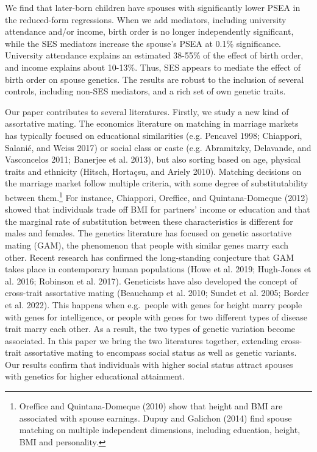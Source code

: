 \documentclass[
]{article}
\theoremstyle{definition}
\theoremstyle{definition}
\theoremstyle{definition}
\theoremstyle{definition}
\theoremstyle{remark}
\begin{document}
We find that later-born children have spouses with significantly lower PSEA in
the reduced-form regressions. When we add mediators, including university
attendance and/or income, birth order is no longer independently significant,
while the SES mediators increase the spouse's PSEA at 0.1\% significance.
University attendance explains an estimated 38-55\% of the effect of birth order,
and income explains about 10-13\%. Thus, SES appears to mediate the effect of
birth order on spouse genetics. The results are robust to the inclusion of
several controls, including non-SES mediators, and a rich set of own genetic
traits.

Our paper contributes to several literatures. Firstly, we study a new kind of
assortative mating. The economics literature on matching in marriage markets has
typically focused on educational similarities (e.g. Pencavel 1998; Chiappori, Salanié, and Weiss 2017) or social class or caste (e.g. Abramitzky, Delavande, and Vasconcelos 2011; Banerjee et al. 2013), but also sorting based on age,
physical traits and ethnicity (Hitsch, Hortaçsu, and Ariely 2010). Matching decisions on the
marriage market follow multiple criteria, with some degree of substitutability
between them.\footnote{Oreffice and Quintana-Domeque (2010) show that height and BMI are associated
  with spouse earnings. Dupuy and Galichon (2014) find spouse matching on multiple
  independent dimensions, including education, height, BMI and personality.} For instance, Chiappori, Oreffice, and Quintana-Domeque (2012) showed that
individuals trade off BMI for partners' income or education and that the
marginal rate of substitution between these characteristics is different for
males and females. The genetics literature has focused on genetic assortative
mating (GAM), the phenomenon that people with similar genes marry each other.
Recent research has confirmed the long-standing conjecture that GAM takes place
in contemporary human populations (Howe et al. 2019; Hugh-Jones et al. 2016; Robinson et al. 2017). Geneticists have also developed the concept of
cross-trait assortative mating (Beauchamp et al. 2010; Sundet et al. 2005; Border et al. 2022). This happens when e.g.~people with genes for height marry
people with genes for intelligence, or people with genes for two different types
of disease trait marry each other. As a result, the two types of genetic
variation become associated. In this paper we bring the two literatures
together, extending cross-trait assortative mating to encompass social status as
well as genetic variants. Our results confirm that individuals with higher
social status attract spouses with genetics for higher educational attainment.
\end{document}

